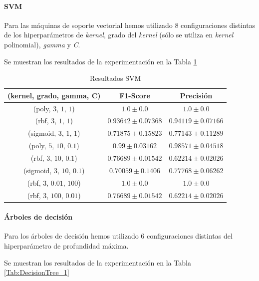 \documentclass[12pt]{article}
\begin{document}
\paragraph{SVM}

Para las máquinas de soporte vectorial hemos utilizado 8 configuraciones distintas de los hiperparámetros de \textit{kernel},
grado del \textit{kernel} (sólo se utiliza en \textit{kernel} polinomial), \textit{gamma} y \textit{C}.

Se muestran los resultados de la experimentación en la Tabla \ref{Tab:SVM_1}

\begin{table}[!ht]
	\caption{Resultados SVM}
	\centering
		\begin{tabular}{||c c c||}
			\hline
			(kernel, grado, gamma, C) & F1-Score & Precisión  \\ [0.5ex]
			\hline\hline
			(poly, $3$, $1$, $1$) & $1.0 \pm 0.0$ & $1.0 \pm 0.0$ \\
			\hline
			(rbf, $3$, $1$, $1$) & $0.93642 \pm 0.07368$ & $0.94119 \pm 0.07166$ \\
			\hline
			(sigmoid, $3$, $1$, $1$) & $0.71875 \pm 0.15823$ & $0.77143 \pm 0.11289$ \\
			\hline
			(poly, $5$, $10$, $0.1$) & $0.99 \pm 0.03162$ & $0.98571 \pm 0.04518$ \\
			\hline
			(rbf, $3$, $10$, $0.1$) & $0.76689 \pm 0.01542$ & $0.62214 \pm 0.02026$ \\
			\hline
			(sigmoid, $3$, $10$, $0.1$) & $0.70059 \pm 0.1406$ & $0.77768 \pm 0.06262$ \\
			\hline
			(rbf, $3$, $0.01$, $100$) & $1.0 \pm 0.0$ & $1.0 \pm 0.0$ \\
			\hline
			(rbf, $3$, $100$, $0.01$) & $0.76689 \pm 0.01542$ & $0.62214 \pm 0.02026$ \\
			\hline
		\end{tabular}
	\label{Tab:SVM_1}
\end{table}

\paragraph{Árboles de decisión}
Para los árboles de decisión hemos utilizado 6 configuraciones distintas del hiperparámetro de profundidad máxima.

Se muestran los resultados de la experimentación en la Tabla \ref{Tab:DecisionTree_1}
\end{document}
